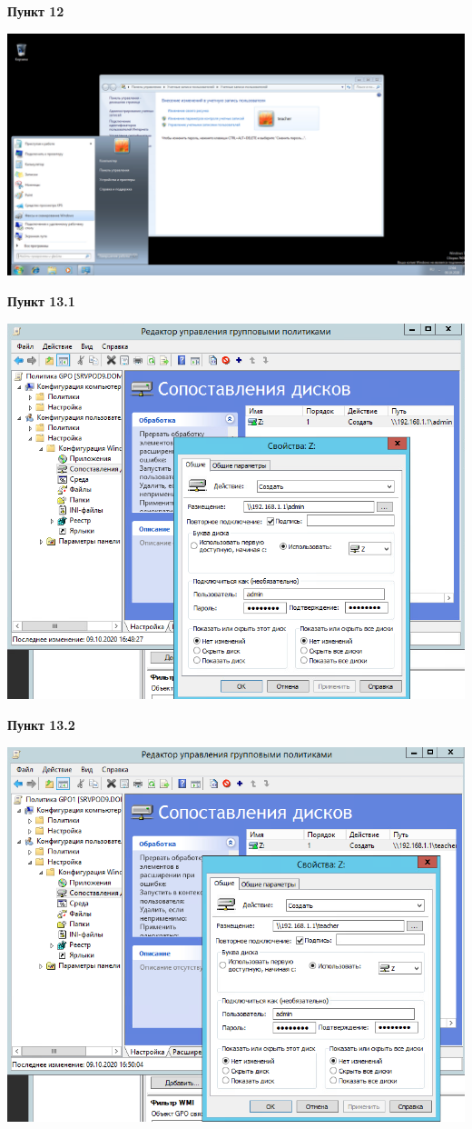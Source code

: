\documentclass[a4paper,14pt]{extarticle}
\begin{document}
    \textbf{Пункт 12}
    \begin{center}
        \includegraphics[scale=0.4]{12}
    \end{center}
    \newpage
    \textbf{Пункт 13.1}
    \begin{center}
        \includegraphics[scale=0.6]{13.1}
    \end{center}
    \textbf{Пункт 13.2}
    \begin{center}
        \includegraphics[scale=0.6]{13.2}
    \end{center}
\end{document}

